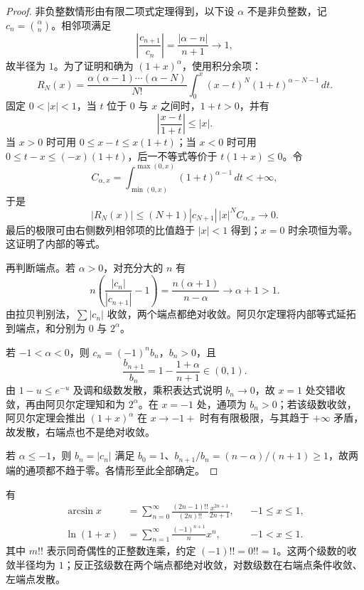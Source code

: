\begin{proof}
非负整数情形由有限二项式定理得到，以下设 $\alpha$ 不是非负整数，记 $c_n=\binom\alpha n$。相邻项满足
\[
    \left|\frac{c_{n+1}}{c_n}\right|
       =\frac{|\alpha-n|}{n+1}\longrightarrow1,
\]
故半径为 $1$。为了证明和确为 $(1+x)^\alpha$，使用积分余项：
\[
    R_N(x)=\frac{\alpha(\alpha-1)\cdots(\alpha-N)}{N!}
       \int_0^x(x-t)^N(1+t)^{\alpha-N-1}\,dt.
\]
固定 $0<|x|<1$，当 $t$ 位于 $0$ 与 $x$ 之间时，$1+t>0$，并有
\[
    \left|\frac{x-t}{1+t}\right|\leq|x|.
\]
当 $x>0$ 时可用 $0\leq x-t\leq x(1+t)$；当 $x<0$ 时可用 $0\leq t-x\leq(-x)(1+t)$，后一不等式等价于 $t(1+x)\leq0$。令
\[
    C_{\alpha,x}=\int_{\min(0,x)}^{\max(0,x)}(1+t)^{\alpha-1}\,dt<+\infty,
\]
于是
\[
    |R_N(x)|\leq (N+1)|c_{N+1}|\,|x|^N C_{\alpha,x}
       \longrightarrow0.
\]
最后的极限可由右侧数列相邻项的比值趋于 $|x|<1$ 得到；$x=0$ 时余项恒为零。这证明了内部的等式。

再判断端点。若 $\alpha>0$，对充分大的 $n$ 有
\[
    n\left(\frac{|c_n|}{|c_{n+1}|}-1\right)
       =\frac{n(\alpha+1)}{n-\alpha}
       \longrightarrow\alpha+1>1.
\]
由拉贝判别法，$\sum|c_n|$ 收敛，两个端点都绝对收敛。阿贝尔定理将内部等式延拓到端点，和分别为 $0$ 与 $2^\alpha$。

若 $-1<\alpha<0$，则 $c_n=(-1)^nb_n$，$b_n>0$，且
\[
    \frac{b_{n+1}}{b_n}=1-\frac{1+\alpha}{n+1}\in(0,1).
\]
由 $1-u\leq e^{-u}$ 及调和级数发散，乘积表达式说明 $b_n\to0$，故 $x=1$ 处交错收敛，再由阿贝尔定理知和为 $2^\alpha$。在 $x=-1$ 处，通项为 $b_n>0$；若该级数收敛，阿贝尔定理会推出 $(1+x)^\alpha$ 在 $x\to-1+$ 时有有限极限，与其趋于 $+\infty$ 矛盾，故发散，右端点也不是绝对收敛。

若 $\alpha\leq-1$，则 $b_n=|c_n|$ 满足 $b_0=1$、$b_{n+1}/b_n=(n-\alpha)/(n+1)\geq1$，故两端的通项都不趋于零。各情形至此全部确定。
\end{proof}

\begin{proposition}[反正弦与对数的展开]
\label{prop:arcsine-and-logarithm-power-expansions}
有
\begin{align}
    \arcsin x
       &=\sum_{n=0}^\infty
         \frac{(2n-1)!!}{(2n)!!}\frac{x^{2n+1}}{2n+1},
       &&-1\leq x\leq1,
       \label{eq:arcsine-maclaurin-expansion}\\
    \ln(1+x)
       &=\sum_{n=1}^\infty\frac{(-1)^{n+1}}n x^n,
       &&-1<x\leq1.
       \label{eq:logarithm-maclaurin-expansion}
\end{align}
其中 $m!!$ 表示同奇偶性的正整数连乘，约定 $(-1)!!=0!!=1$。这两个级数的收敛半径均为 $1$；反正弦级数在两个端点都绝对收敛，对数级数在右端点条件收敛、左端点发散。
\end{proposition}

